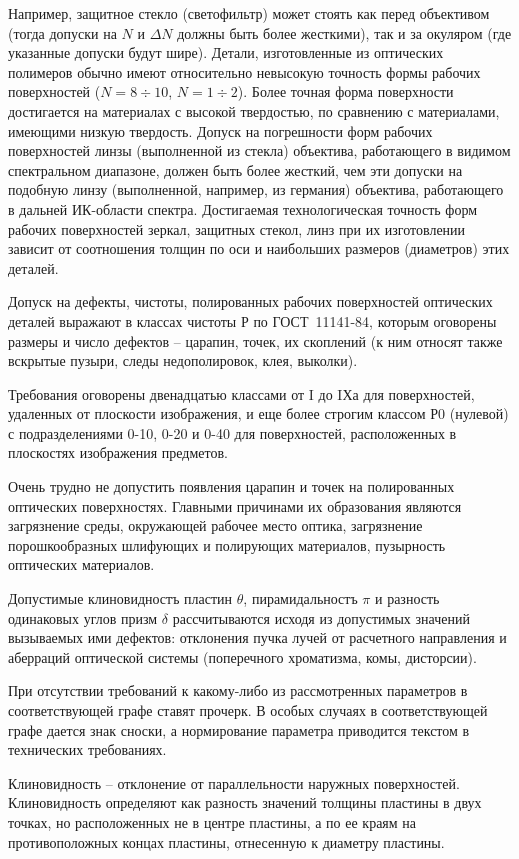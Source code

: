\begin{enumerate}
	Например, защитное стекло (светофильтр) может стоять как перед объективом (тогда допуски на $N$ и $\Delta N$ должны быть более жесткими), так и за окуляром (где указанные допуски будут шире). Детали, изготовленные из оптических полимеров обычно имеют относительно невысокую точность формы рабочих поверхностей ($N=8\div10$,  $N=1\div2$). Более точная форма поверхности достигается на материалах с высокой твердостью, по сравнению с материалами, имеющими низкую твердость. Допуск на погрешности форм рабочих поверхностей линзы (выполненной из стекла) объектива, работающего в видимом спектральном диапазоне, должен быть более жесткий, чем эти допуски на подобную линзу (выполненной, например, из германия) объектива, работающего в дальней ИК-области спектра. Достигаемая технологическая точность форм рабочих поверхностей зеркал, защитных стекол, линз при их изготовлении зависит от соотношения толщин по оси и наибольших размеров (диаметров) этих деталей.
	
	Допуск на дефекты, чистоты, полированных рабочих поверхностей оптических деталей выражают в классах чистоты $Р$ по ГОСТ~11141-84, которым оговорены размеры и число дефектов -- царапин, точек, их скоплений (к ним относят также вскрытые пузыри, следы недополировок, клея, выколки).
	
	Требования оговорены двенадцатью классами от I до IХа для поверхностей, удаленных от плоскости изображения, и еще более строгим классом Р0 (нулевой) с подразделениями 0-10, 0-20 и 0-40 для поверхностей, расположенных в плоскостях изображения предметов.
	
	Очень трудно не допустить появления царапин и точек на полированных оптических поверхностях. Главными причинами их образования являются загрязнение среды, окружающей рабочее место оптика, загрязнение порошкообразных шлифующих и полирующих материалов, пузырность оптических материалов.
	
	Допустимые клиновидностъ пластин $\theta$, пирамидальностъ $\pi$ и разность одинаковых углов призм $\delta$ рассчитываются исходя из допустимых значений вызываемых ими дефектов: отклонения пучка лучей от расчетного направления и аберраций оптической системы (поперечного хроматизма, комы, дисторсии). 
	
	При отсутствии требований к какому-либо из рассмотренных параметров в соответствующей графе ставят прочерк. В особых случаях в соответствующей графе дается знак сноски, а нормирование параметра приводится текстом в технических требованиях.
	
	Клиновидность -- отклонение от параллельности наружных поверхностей. Клиновидность определяют как разность значений толщины пластины в двух точках, но расположенных не в центре пластины, а по ее краям на противоположных концах пластины, отнесенную к диаметру пластины.
	

\end{enumerate}
